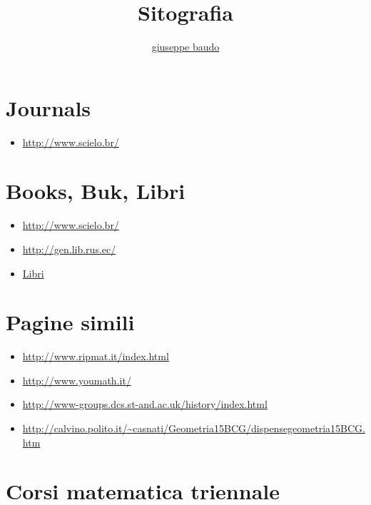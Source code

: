 \documentclass[a4paper,10pt]{article}
\title{Sitografia}
\author{\href{http://www.baudo.hol.es}{giuseppe baudo}}
\begin{document}
\maketitle

\section{Journals}
\begin{itemize}
 \item \url{http://www.scielo.br/}
\end{itemize}

\section{Books, Buk, Libri}
\begin{itemize}
	\item \url{http://www.scielo.br/}
	\item \url{http://gen.lib.rus.ec/}
	\item \href{Libri.html}{Libri}
\end{itemize}

\section{Pagine simili}
\begin{itemize}
 \item \url{http://www.ripmat.it/index.html}
 \item \url{http://www.youmath.it/}
 \item \url{http://www-groups.dcs.st-and.ac.uk/history/index.html}
 \item \url{http://calvino.polito.it/~casnati/Geometria15BCG/dispensegeometria15BCG.htm}
\end{itemize}

\section{Corsi matematica triennale}
\end{document}
